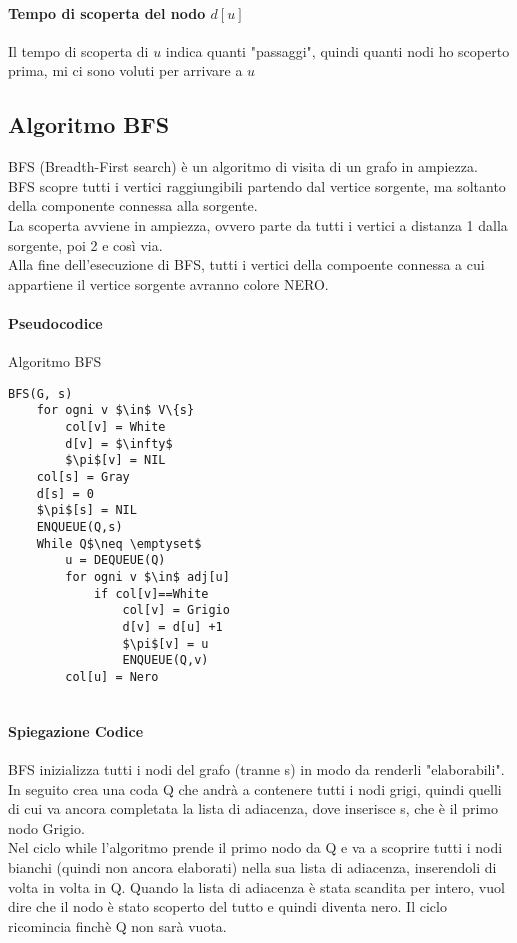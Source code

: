 \documentclass[12pt, a4paper, openany]{book}
\begin{document}
\paragraph{Tempo di scoperta del nodo $d[u]$}
Il tempo di scoperta di $u$ indica quanti "passaggi", quindi quanti nodi ho scoperto prima, mi ci sono voluti per arrivare a $u$

\subsection{Algoritmo BFS}
BFS (Breadth-First search) è un algoritmo di visita di un grafo in ampiezza.
\\BFS scopre tutti i vertici raggiungibili partendo dal vertice sorgente, ma soltanto della componente connessa alla sorgente.
\\La scoperta avviene in ampiezza, ovvero parte da tutti i vertici a distanza 1 dalla sorgente, poi 2 e così via.
\\Alla fine dell'esecuzione di BFS, tutti i vertici della compoente connessa a cui appartiene il vertice sorgente avranno colore NERO.

\paragraph{Pseudocodice} Algoritmo BFS
\begin{lstlisting}[mathescape=true]
BFS(G, s)
    for ogni v $\in$ V\{s}
        col[v] = White
        d[v] = $\infty$
        $\pi$[v] = NIL
    col[s] = Gray
    d[s] = 0
    $\pi$[s] = NIL
    ENQUEUE(Q,s)
    While Q$\neq \emptyset$
        u = DEQUEUE(Q)
        for ogni v $\in$ adj[u]
            if col[v]==White
                col[v] = Grigio
                d[v] = d[u] +1
                $\pi$[v] = u
                ENQUEUE(Q,v)
        col[u] = Nero
    
\end{lstlisting}
\paragraph{Spiegazione Codice}
BFS inizializza tutti i nodi del grafo (tranne s) in modo da renderli "elaborabili".
In seguito crea una coda Q che andrà a contenere tutti i nodi grigi, quindi quelli di cui va ancora completata la lista di adiacenza,
dove inserisce s, che è il primo nodo Grigio.
\\Nel ciclo while l'algoritmo prende il primo nodo da Q e va a scoprire tutti i nodi bianchi (quindi non ancora elaborati) nella sua lista di adiacenza,
inserendoli di volta in volta in Q. Quando la lista di adiacenza è stata scandita per intero, vuol dire che il nodo è stato scoperto del tutto e quindi diventa nero.
Il ciclo ricomincia finchè Q non sarà vuota.
\end{document}
